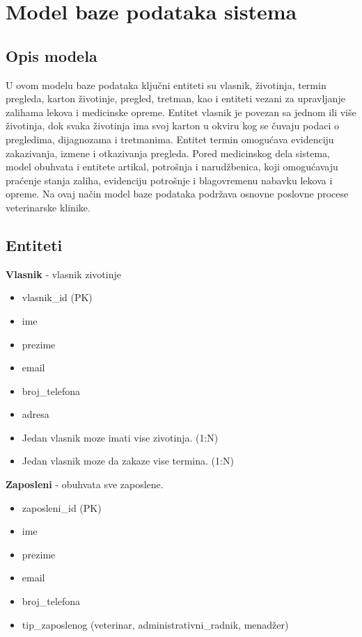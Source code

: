 \section{Model baze podataka sistema}
\subsection{Opis modela}
\indent U ovom modelu baze podataka ključni entiteti su vlasnik, životinja, termin pregleda, karton životinje, pregled, tretman, kao i entiteti vezani za upravljanje zalihama lekova i medicinske opreme. Entitet vlasnik je povezan sa jednom ili više životinja, dok svaka životinja ima svoj karton u okviru kog se čuvaju podaci o pregledima, dijagnozama i tretmanima. Entitet termin omogućava evidenciju zakazivanja, izmene i otkazivanja pregleda. Pored medicinskog dela sistema, model obuhvata i entitete artikal, potrošnja i narudžbenica, koji omogućavaju praćenje stanja zaliha, evidenciju potrošnje i blagovremenu nabavku lekova i opreme. Na ovaj način model baze podataka podržava osnovne poslovne procese veterinarske klinike.
\subsection{Entiteti}

\indent\textbf{Vlasnik} - vlasnik zivotinje
\begin{itemize}{Atributi:}
    \item vlasnik\_id (PK)
    \item ime
    \item prezime
    \item email
    \item broj\_telefona
    \item adresa
\end{itemize}
\begin{itemize}{Veze:}
    \item Jedan vlasnik moze imati vise zivotinja. (1:N)
    \item Jedan vlasnik moze da zakaze vise termina. (1:N)
\end{itemize}

\indent \textbf{Zaposleni} - obuhvata sve zaposlene. 
\begin{itemize}{Atributi:}
    \item zaposleni\_id (PK)
    \item ime
    \item prezime
    \item email
    \item broj\_telefona
    \item tip\_zaposlenog (veterinar, administrativni\_radnik, menadžer)
\end{itemize}

